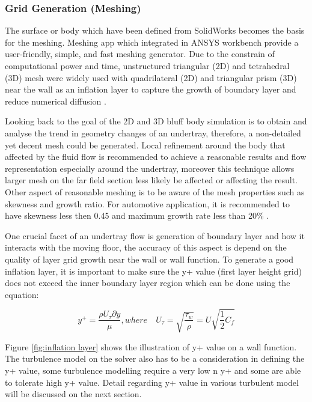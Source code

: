 \subsubsection{Grid Generation (Meshing)}
The surface or body which have been defined from SolidWorks becomes the basis for the meshing. Meshing app which integrated in ANSYS workbench provide a user-friendly, simple, and fast meshing generator. Due to the constrain of computational power and time, unstructured triangular (2D) and tetrahedral (3D) mesh were widely used with quadrilateral (2D) and triangular prism (3D) near the wall as an inflation layer to capture the growth of boundary layer and reduce numerical diffusion \cite{Lanfrit2005BestFLUENT}.

\noindent Looking back to the goal of the 2D and 3D bluff body simulation is to obtain and analyse the trend in geometry changes of an undertray, therefore, a non-detailed yet decent mesh could be generated. Local refinement around the body that affected by the fluid flow is recommended \cite{Lanfrit2005BestFLUENT} to achieve a reasonable results and flow representation especially around the undertray, moreover this technique allows larger mesh on the far field section less likely be affected or affecting the result. Other aspect of reasonable meshing is to be aware of the mesh properties such as skewness and growth ratio. For automotive application, it is recommended to have skewness less then 0.45 and maximum growth rate less than 20\% \cite{Lanfrit2005BestFLUENT}. 

\noindent One crucial facet of an undertray flow is generation of boundary layer and how it interacts with the moving floor, the accuracy of this aspect is depend on the quality of layer grid growth near the wall or wall function. To generate a good inflation layer, it is important to make sure the y+ value (first layer height grid) does not exceed the inner boundary layer region which can be done using the equation:

\begin{equation}
    y^+ = \frac{\rho U_\tau \partial y}{\mu}, where \quad U_\tau = \sqrt{\frac{\tau_w}{\rho}} = U \sqrt{\frac{1}{2}C_f}
\end{equation}

\noindent Figure \ref{fig:inflation layer} shows the illustration of y+ value on a wall function. The turbulence model on the solver also has to be a consideration in defining the y+ value, some turbulence modelling require a very low n y+ and some are able to tolerate high y+ value. Detail regarding y+ value in various turbulent model will be discussed on the next section. 

